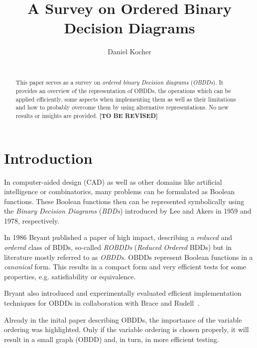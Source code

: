 \documentclass{vldb}
\newcommand{\tbr}{\textbf{[TO BE REVISED]}}
\begin{document}
\title{A Survey on Ordered Binary Decision Diagrams}


\author{
\alignauthor
	Daniel Kocher\\
    \\
}

\maketitle

\begin{abstract}
This paper serves as a survey on \textit{ordered binary Decision diagrams}
(\textit{OBDDs}). It provides an overview of the representation of OBDDs, the
operations which can be applied efficiently, some aspects when implementing them
as well as their limitations and how to probably overcome them by using
alternative representations. No new results or insights are provided. \tbr
\end{abstract}

\section{Introduction}
\label{sec:introduction}

In computer-aided design (CAD) as well as other domains like artificial
intelligence or combinatorics, many problems can be formulated as Boolean
functions. These Boolean functions then can be represented symbolically using the
\textit{Binary Decision Diagrams} (\textit{BDDs}) introduced by Lee\cite{LEE59}
and Akers\cite{AKERS78} in 1959 and 1978, respectively.

In 1986 Bryant\cite{BRYANT86} published a paper of high impact, describing a
\textit{reduced} and \textit{ordered} class of BDDs, so-called \textit{ROBDDs}
(\textit{Reduced Ordered} BDDs) but in literature mostly referred to as
\textit{OBDDs}. OBDDs represent Boolean functions in a \textit{canonical}
form. This results in a compact form and very efficient tests for some properties,
e.g. satisfiability or equivalence\cite{BRYANT86}.

Bryant also introduced and experimentally evaluated efficient implementation
techniques for OBDDs in collaboration with Brace and
Rudell~\cite{BRACE90, BRYANT92}.

Already in the inital paper describing OBDDs, the importance of the variable
ordering was highlighted. Only if the variable ordering is chosen properly, it
will result in a small graph (OBDD) and, in turn, in more efficient testing.
\end{document}
